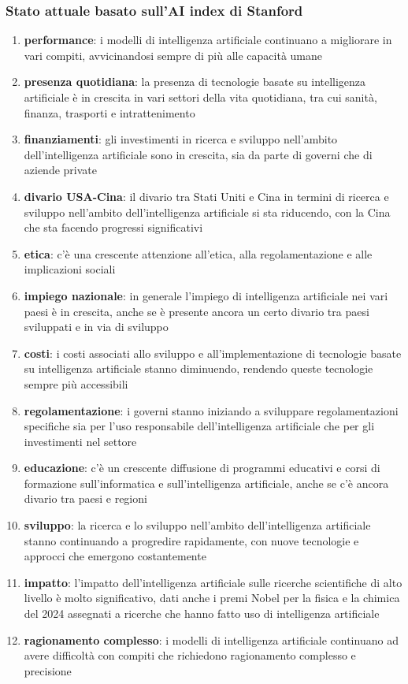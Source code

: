 \subsubsection*{Stato attuale basato sull'AI index di Stanford}
\begin{enumerate}
	\item \textbf{performance}: i modelli di intelligenza artificiale continuano a migliorare in vari compiti, avvicinandosi
	sempre di più alle capacità umane
	\item \textbf{presenza quotidiana}: la presenza di tecnologie basate su intelligenza artificiale è in crescita in vari settori della
	vita quotidiana, tra cui sanità, finanza, trasporti e intrattenimento
	\item \textbf{finanziamenti}: gli investimenti in ricerca e sviluppo nell'ambito dell'intelligenza artificiale sono in
	crescita, sia da parte di governi che di aziende private
	\item \textbf{divario USA-Cina}: il divario tra Stati Uniti e Cina in termini di ricerca e sviluppo nell'ambito
	dell'intelligenza artificiale si sta riducendo, con la Cina che sta facendo progressi significativi
	\item \textbf{etica}: c'è una crescente attenzione all'etica, alla regolamentazione e alle implicazioni sociali
	\item \textbf{impiego nazionale}: in generale l'impiego di intelligenza artificiale nei vari paesi è in crescita, anche se 
	è presente ancora un certo divario tra paesi sviluppati e in via di sviluppo
	\item \textbf{costi}: i costi associati allo sviluppo e all'implementazione di tecnologie basate su intelligenza artificiale
	stanno diminuendo, rendendo queste tecnologie sempre più accessibili
	\item \textbf{regolamentazione}: i governi stanno iniziando a sviluppare regolamentazioni specifiche sia per l'uso
	responsabile dell'intelligenza artificiale che per gli investimenti nel settore
	\item \textbf{educazione}: c'è un crescente diffusione di programmi educativi e corsi di formazione sull'informatica
	e sull'intelligenza artificiale, anche se c'è ancora divario tra paesi e regioni
	\item \textbf{sviluppo}: la ricerca e lo sviluppo nell'ambito dell'intelligenza artificiale stanno continuando a progredire
	rapidamente, con nuove tecnologie e approcci che emergono costantemente
	\item \textbf{impatto}: l'impatto dell'intelligenza artificiale sulle ricerche scientifiche di alto livello è molto
	significativo, dati anche i premi Nobel per la fisica e la chimica del 2024 assegnati a ricerche che hanno fatto uso
	di intelligenza artificiale
	\item \textbf{ragionamento complesso}: i modelli di intelligenza artificiale continuano ad avere difficoltà con compiti
	che richiedono ragionamento complesso e precisione
\end{enumerate}

